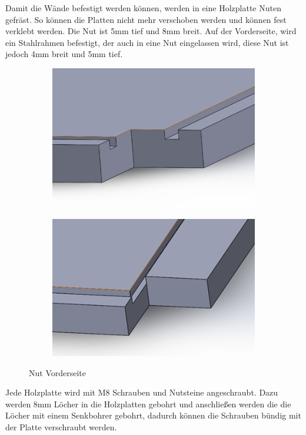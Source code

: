 Damit die Wände befestigt werden können, werden in eine Holzplatte Nuten gefräst. So können die Platten nicht mehr verschoben werden und können fest verklebt werden. Die Nut ist 5mm tief und 8mm breit. Auf der Vorderseite, wird ein Stahlrahmen befestigt,  der auch in eine Nut eingelassen wird, diese Nut ist jedoch 4mm breit und 5mm tief. 
\vspace{5mm}
\begin{figure}[H]
    \centering
    \begin{subfigure}[b]{0.4\textwidth}
        \centering
        \includegraphics[width=\textwidth]{image/Bild1nut.png}
        
        \label{fig:bild1}
    \end{subfigure}
    \hfill
    \begin{subfigure}[b]{0.41\textwidth}
        \centering
        \includegraphics[width=\textwidth]{image/Bild2nut.png}
        
        \label{fig:bild2}
    \end{subfigure}
    \caption{Nut Vorderseite}
    \label{fig:zwei_bilder}
\end{figure}
Jede Holzplatte wird mit M8 Schrauben und Nutsteine angeschraubt. Dazu werden 8mm Löcher in die Holzplatten gebohrt und anschließen werden die die Löcher mit einem Senkbohrer gebohrt, dadurch können die Schrauben bündig mit der Platte verschraubt werden. 
\newpage